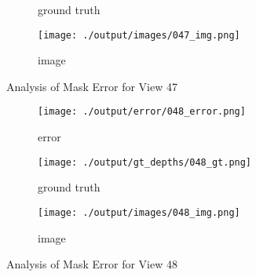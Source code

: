 \documentclass{article}
\begin{document}
\begin{figure}
\begin{subfigure}{0.3\textwidth}
		\caption{ground truth}
		\label{fig:gt47}
	\end{subfigure}
	\hfill
	\centering
	\begin{subfigure}{0.3\textwidth}
		\centering
		\texttt{[image: ./output/images/047\_img.png]}
		\caption{image}
		\label{fig:img47}
	\end{subfigure}
	\hfill
	\caption{Analysis of Mask Error for View 47}
	\label{fig:error_analys47}
\end{figure}\begin{figure}
	\centering
	\begin{subfigure}{0.3\textwidth}
		\centering
		\texttt{[image: ./output/error/048\_error.png]}
		\caption{error}
		\label{fig:error48}
	\end{subfigure}
	\hfill
	\centering
	\begin{subfigure}{0.3\textwidth}
		\centering
		\texttt{[image: ./output/gt\_depths/048\_gt.png]}
		\caption{ground truth}
		\label{fig:gt48}
	\end{subfigure}
	\hfill
	\centering
	\begin{subfigure}{0.3\textwidth}
		\centering
		\texttt{[image: ./output/images/048\_img.png]}
		\caption{image}
		\label{fig:img48}
	\end{subfigure}
	\hfill
	\caption{Analysis of Mask Error for View 48}
	\label{fig:error_analys48}
\end{figure}
\end{document}
